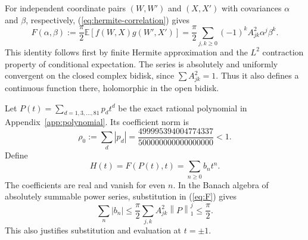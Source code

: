 \documentclass[11pt]{article}
\theoremstyle{definition}\newtheorem{definition}[theorem]{Definition}
\newcommand{\E}{\mathbb E}
\newcommand{\norm}[1]{\left\lVert#1\right\rVert}
\begin{document}
For independent coordinate pairs $(W,W')$ and $(X,X')$ with covariances
$\alpha$ and $\beta$, respectively, (\ref{eq:hermite-correlation}) gives
\begin{equation}\label{eq:F}
 F(\alpha,\beta):=\frac\pi2\E[f(W,X)g(W',X')]
 =\frac\pi2\sum_{j,k\geq0}(-1)^k A_{jk}^2\alpha^j\beta^k.
\end{equation}
This identity follows first by finite Hermite approximation and the
$L^2$ contraction property of conditional expectation. The series is
absolutely and uniformly convergent on the closed complex bidisk, since
$\sum A_{jk}^2=1$. Thus it also defines a continuous function there,
holomorphic in the open bidisk.

Let $P(t)=\sum_{d=1,3,\ldots,81}p_dt^d$ be the exact rational polynomial
in Appendix~\ref{app:polynomial}. Its coefficient norm is
\begin{equation}\label{eq:Pnorm}
 \rho_0:=\sum_d|p_d|
 =\frac{499995394004774337}{500000000000000000}<1.
\end{equation}
Define
\begin{equation}\label{eq:H}
 H(t)=F(P(t),t)=\sum_{n\geq0}b_nt^n.
\end{equation}
The coefficients are real and vanish for even $n$. In the Banach algebra
of absolutely summable power series, substitution in (\ref{eq:F}) gives
\begin{equation}\label{eq:Habsolute}
 \sum_n|b_n|\leq\frac\pi2\sum_{j,k}A_{jk}^2\norm{P}_1^j
 \leq\frac\pi2.
\end{equation}
This also justifies substitution and evaluation at $t=\pm1$.
\end{document}
